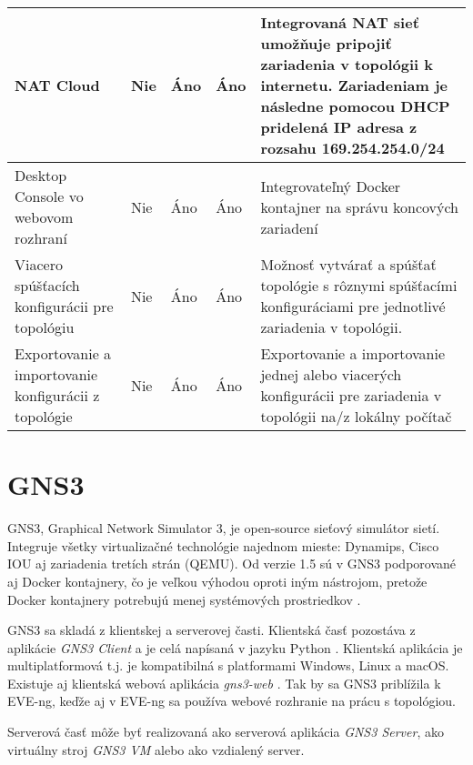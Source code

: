 \begin{longtable}{| m{3cm} | m{2cm} | m{2cm} | m{2cm} | m{4cm} |}
NAT Cloud                                             & Nie                & Áno             & Áno                  & Integrovaná NAT sieť umožňuje pripojiť zariadenia v topológii k internetu. Zariadeniam je následne pomocou DHCP pridelená IP adresa z rozsahu 169.254.254.0/24 \\ \hline
Desktop Console vo webovom rozhraní                                  & Nie                & Áno             & Áno                  & Integrovateľný Docker kontajner na správu koncových zariadení                          \\ \hline
Viacero spúšťacích konfigurácii pre topológiu            & Nie                & Áno             & Áno                  & Možnosť vytvárať a spúšťať topológie s rôznymi spúšťacími konfiguráciami pre jednotlivé zariadenia v topológii.                     \\ \hline
Exportovanie a importovanie konfigurácii z topológie     & Nie                & Áno             & Áno                  & Exportovanie a importovanie jednej alebo viacerých konfigurácii pre zariadenia v topológii na/z lokálny počítač                                             \\ \hline  
\end{longtable}





\section{GNS3}

GNS3, Graphical Network Simulator 3, je open-source sieťový simulátor sietí. Integruje všetky virtualizačné technológie najednom mieste: Dynamips, Cisco IOU aj zariadenia tretích strán (QEMU). Od verzie 1.5 sú v GNS3 podporované aj Docker kontajnery, čo je veľkou výhodou oproti iným nástrojom, pretože Docker kontajnery potrebujú menej systémových prostriedkov \cite{gns3_docker}.

GNS3 sa skladá z klientskej a serverovej časti. Klientská časť pozostáva z aplikácie \emph{GNS3 Client} a je celá napísaná v jazyku Python \cite{gns3_gui_github}. Klientská aplikácia je multiplatformová t.j. je kompatibilná s platformami Windows, Linux a macOS. Existuje aj klientská webová aplikácia \emph{gns3-web} \cite{gns3_web_github}. Tak by sa GNS3 priblížila k EVE-ng, keďže aj v EVE-ng sa používa webové rozhranie na prácu s topológiou.

Serverová časť môže byť realizovaná ako serverová aplikácia \emph{GNS3 Server}, ako virtuálny stroj \emph{GNS3 VM} alebo ako vzdialený server.

